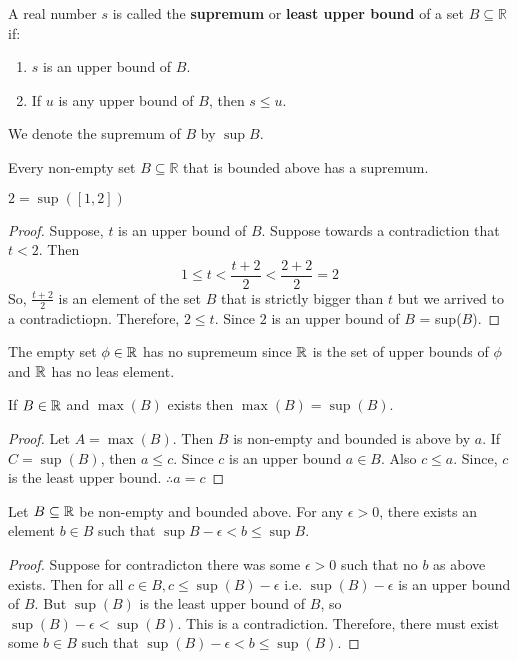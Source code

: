 \documentclass[11pt]{article}
\begin{document}
\begin{definition}
    A real number \(s\) is called the \textbf{supremum} or \textbf{least upper bound} of a set \(B \subseteq \mathbb{R}\) if:
    \begin{enumerate}
        \item \(s\) is an upper bound of \(B\).
        \item If \(u\) is any upper bound of \(B\), then \(s \leq u\).
    \end{enumerate}
    We denote the supremum of \(B\) by \(\sup B\).
\end{definition}

\begin{theorem}
    Every non-empty set \(B \subseteq \mathbb{R}\) that is bounded above has a supremum.
\end{theorem}

\begin{example}
    \(2 = \sup([1, 2])\)
\end{example}
\begin{proof}
    Suppose, \(t\) is an upper bound of \(B\). Suppose towards a contradiction that \(t < 2\). Then \[1 \leqslant t < \frac{t + 2}{2} < \frac{2 + 2}{2} = 2\]
    So, \(\frac{t + 2}{2}\) is an element of the set \(B\) that is strictly bigger
    than \(t\) but we arrived to a contradictiopn. Therefore, \(2 \leqslant t\).
    Since \(2\) is an upper bound of \(B\) = sup(\(B\)).
\end{proof}

\begin{example}
    The empty set \(\phi \in \mathbb R\) has no supremeum since \(\mathbb R\) is the set of upper bounds of \(\phi\) and \(\mathbb R\) has no leas element.
\end{example}

\begin{proposition}
    If \(B \in \mathbb R\) and \(\max(B)\) exists then \(\max(B) = \sup(B)\).
\end{proposition}

\begin{proof}
    Let \(A = \max(B)\). Then \( B\) is non-empty and bounded is above by \(a\). If \(C = \sup(B)\), then \(a \leq c\). Since \(c\) is an upper bound \(a \in B\). Also \(c \leqslant a\). Since, \(c\) is the least upper bound. \(\therefore a = c\)
\end{proof}

\begin{proposition}
    Let \(B \subseteq \mathbb R\) be non-empty and bounded above. For any \(\epsilon > 0\), there exists an element \(b \in B\) such that \(\sup B - \epsilon < b \leq \sup B\).
\end{proposition}
\begin{proof}
    Suppose for contradicton there was some \(\epsilon > 0\) such that no \(b\) as above exists. Then for all \(c \in B, c \leqslant \sup(B) - \epsilon\) i.e. \(\sup(B) - \epsilon\) is an upper bound of \(B\). But \(\sup(B)\) is the least upper bound of \(B\), so \(\sup(B) - \epsilon < \sup(B)\). This is a contradiction. Therefore, there must exist some \(b \in B\) such that \(\sup(B) - \epsilon < b \leq \sup(B)\).
\end{proof}
\end{document}
